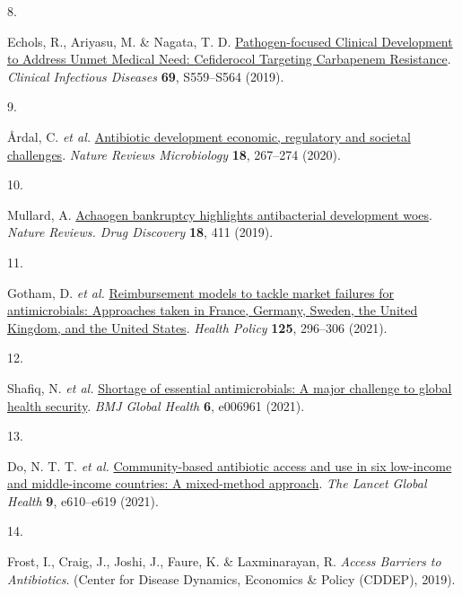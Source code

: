 \documentclass[
]{book}
\newlength{\cslhangindent}
\newlength{\csllabelwidth}
\newlength{\cslentryspacingunit} %
\newenvironment{CSLReferences}[2] %
 {%
  \setlength{\parindent}{0pt}
  \ifodd #1
  \let\oldpar\par
  \def\par{\hangindent=\cslhangindent\oldpar}
  \fi
  \setlength{\parskip}{#2\cslentryspacingunit}
 }%
 {}
\newcommand{\CSLLeftMargin}[1]{\parbox[t]{\csllabelwidth}{#1}}
\newcommand{\CSLRightInline}[1]{\parbox[t]{\linewidth - \csllabelwidth}{#1}\break}
\begin{document}
\begin{CSLReferences}{0}{0}
\leavevmode{}%
\CSLLeftMargin{8. }
\CSLRightInline{Echols, R., Ariyasu, M. \& Nagata, T. D. \href{https://doi.org/10.1093/cid/ciz829}{Pathogen-focused {Clinical Development} to {Address Unmet Medical Need}: {Cefiderocol Targeting Carbapenem Resistance}}. \emph{Clinical Infectious Diseases} \textbf{69}, S559--S564 (2019).}

\leavevmode{}%
\CSLLeftMargin{9. }
\CSLRightInline{Årdal, C. \emph{et al.} \href{https://doi.org/10.1038/s41579-019-0293-3}{Antibiotic development \textemdash{} economic, regulatory and societal challenges}. \emph{Nature Reviews Microbiology} \textbf{18}, 267--274 (2020).}

\leavevmode{}%
\CSLLeftMargin{10. }
\CSLRightInline{Mullard, A. \href{https://doi.org/10.1038/d41573-019-00085-w}{Achaogen bankruptcy highlights antibacterial development woes}. \emph{Nature Reviews. Drug Discovery} \textbf{18}, 411 (2019).}

\leavevmode{}%
\CSLLeftMargin{11. }
\CSLRightInline{Gotham, D. \emph{et al.} \href{https://doi.org/10.1016/j.healthpol.2020.11.015}{Reimbursement models to tackle market failures for antimicrobials: {Approaches} taken in {France}, {Germany}, {Sweden}, the {United Kingdom}, and the {United States}}. \emph{Health Policy} \textbf{125}, 296--306 (2021).}

\leavevmode{}%
\CSLLeftMargin{12. }
\CSLRightInline{Shafiq, N. \emph{et al.} \href{https://doi.org/10.1136/bmjgh-2021-006961}{Shortage of essential antimicrobials: A major challenge to global health security}. \emph{BMJ Global Health} \textbf{6}, e006961 (2021).}

\leavevmode{}%
\CSLLeftMargin{13. }
\CSLRightInline{Do, N. T. T. \emph{et al.} \href{https://doi.org/10.1016/S2214-109X(21)00024-3}{Community-based antibiotic access and use in six low-income and middle-income countries: A mixed-method approach}. \emph{The Lancet Global Health} \textbf{9}, e610--e619 (2021).}

\leavevmode{}%
\CSLLeftMargin{14. }
\CSLRightInline{Frost, I., Craig, J., Joshi, J., Faure, K. \& Laxminarayan, R. \emph{Access {Barriers} to {Antibiotics}}. ({Center for Disease Dynamics, Economics \& Policy (CDDEP)}, 2019).}

\end{CSLReferences}
\end{document}
